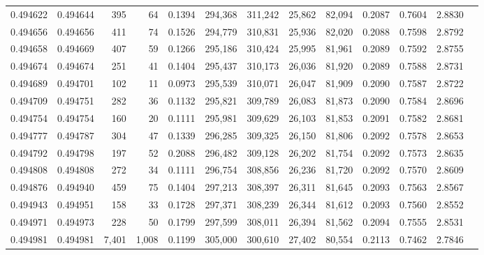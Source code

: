 \begin{tabular}{rrrrrrrrrrrrr}
0.494622 & 0.494644 &   395 &    64 &                                     0.1394 & 294,368 & 311,242 &  25,862 &  82,094 & 0.2087 & 0.7604 & 2.8830 \\
0.494656 & 0.494656 &   411 &    74 &                                     0.1526 & 294,779 & 310,831 &  25,936 &  82,020 & 0.2088 & 0.7598 & 2.8792 \\
0.494658 & 0.494669 &   407 &    59 &                                     0.1266 & 295,186 & 310,424 &  25,995 &  81,961 & 0.2089 & 0.7592 & 2.8755 \\
0.494674 & 0.494674 &   251 &    41 &                                     0.1404 & 295,437 & 310,173 &  26,036 &  81,920 & 0.2089 & 0.7588 & 2.8731 \\
0.494689 & 0.494701 &   102 &    11 &                                     0.0973 & 295,539 & 310,071 &  26,047 &  81,909 & 0.2090 & 0.7587 & 2.8722 \\
0.494709 & 0.494751 &   282 &    36 &                                     0.1132 & 295,821 & 309,789 &  26,083 &  81,873 & 0.2090 & 0.7584 & 2.8696 \\
0.494754 & 0.494754 &   160 &    20 &                                     0.1111 & 295,981 & 309,629 &  26,103 &  81,853 & 0.2091 & 0.7582 & 2.8681 \\
0.494777 & 0.494787 &   304 &    47 &                                     0.1339 & 296,285 & 309,325 &  26,150 &  81,806 & 0.2092 & 0.7578 & 2.8653 \\
0.494792 & 0.494798 &   197 &    52 &                                     0.2088 & 296,482 & 309,128 &  26,202 &  81,754 & 0.2092 & 0.7573 & 2.8635 \\
0.494808 & 0.494808 &   272 &    34 &                                     0.1111 & 296,754 & 308,856 &  26,236 &  81,720 & 0.2092 & 0.7570 & 2.8609 \\
0.494876 & 0.494940 &   459 &    75 &                                     0.1404 & 297,213 & 308,397 &  26,311 &  81,645 & 0.2093 & 0.7563 & 2.8567 \\
0.494943 & 0.494951 &   158 &    33 &                                     0.1728 & 297,371 & 308,239 &  26,344 &  81,612 & 0.2093 & 0.7560 & 2.8552 \\
0.494971 & 0.494973 &   228 &    50 &                                     0.1799 & 297,599 & 308,011 &  26,394 &  81,562 & 0.2094 & 0.7555 & 2.8531 \\
0.494981 & 0.494981 & 7,401 & 1,008 &                                     0.1199 & 305,000 & 300,610 &  27,402 &  80,554 & 0.2113 & 0.7462 & 2.7846 \\

\end{tabular}
